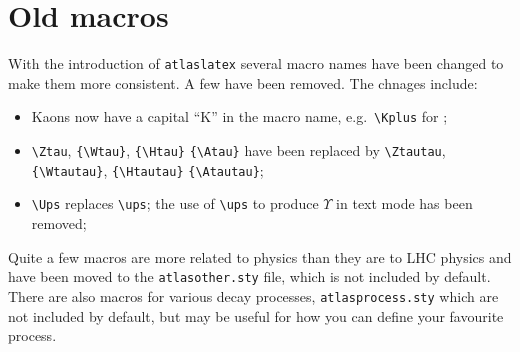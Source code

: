 \documentclass{style/atlasdoc}
\begin{document}
\section{Old macros}
\label{sec:old}

With the introduction of \texttt{atlaslatex} several macro names have been changed to make them more consistent.
A few have been removed. The chnages include:
\begin{itemize}
\item Kaons now have a capital ``K'' in the macro name, e.g.\ \verb|\Kplus| for \Kplus;
\item \verb|\Ztau|, \verb|{\Wtau}|, \verb|{\Htau}| \verb|{\Atau}| have been replaced by
	\verb|\Ztautau|, \verb|{\Wtautau}|, \verb|{\Htautau}| \verb|{\Atautau}|;
\item \verb|\Ups| replaces \verb|\ups|;
	the use of \verb|\ups| to produce $\Upsilon$ in text mode has been removed;
\end{itemize}

Quite a few macros are more related to \Zboson physics than they are to LHC physics and have
been moved to the \texttt{atlasother.sty} file, which is not included by default.
There are also macros for various decay processes, \texttt{atlasprocess.sty} which are not included by default,
but may be useful for how you can define your favourite process.
\end{document}
